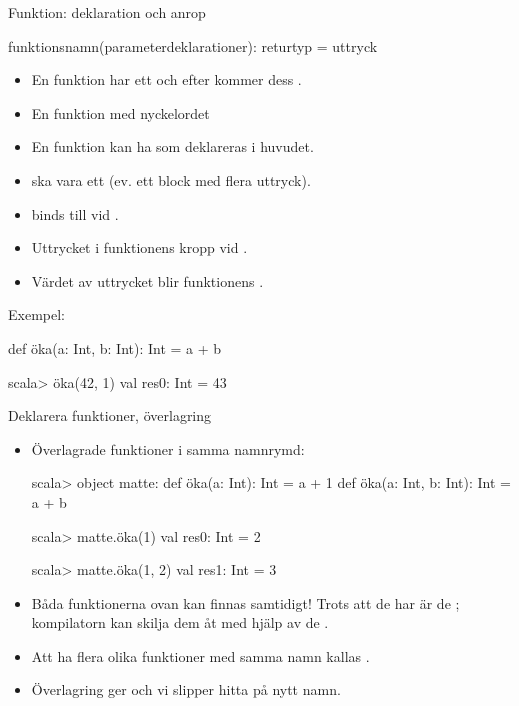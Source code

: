 \begin{Slide}{Funktion: deklaration och anrop}
\SlideOnly{\setlength{\leftmargini}{0pt}}

 funktionsnamn(parameterdeklarationer): returtyp = uttryck
\vspace{0.5em}


\begin{itemize}\SlideFontSmall
  \item En funktion har ett  och efter \code{=} kommer dess .
  \item En  funktion  med nyckelordet 
  \item En funktion kan ha  som deklareras i huvudet. 
  \item {} ska vara ett  (ev. ett block med flera uttryck).
  \item {} binds till  vid .
  \item Uttrycket i funktionens kropp  vid . 
  \item Värdet av uttrycket blir funktionens . 
\end{itemize}

\pause
Exempel:
\begin{Code}
def öka(a: Int, b: Int): Int = a + b
\end{Code}
\pause
\begin{REPLnonum}
scala> öka(42, 1)
val res0: Int = 43
\end{REPLnonum}

\end{Slide}


\begin{Slide}{Deklarera funktioner, överlagring}\SlideFontSmall
\begin{itemize}
\item Överlagrade funktioner i samma namnrymd:
\begin{REPL}
scala> object matte:
         def öka(a: Int): Int = a + 1
         def öka(a: Int, b: Int): Int = a + b

scala> matte.öka(1)
val res0: Int = 2

scala> matte.öka(1, 2)
val res1: Int = 3

\end{REPL}
\item Båda funktionerna ovan kan finnas samtidigt! Trots att de har  är de ; kompilatorn kan skilja dem åt med hjälp av de .

\item Att ha flera olika funktioner med samma namn kallas  .
\item Överlagring ger  och vi slipper hitta på nytt namn.
\end{itemize}
\end{Slide}



